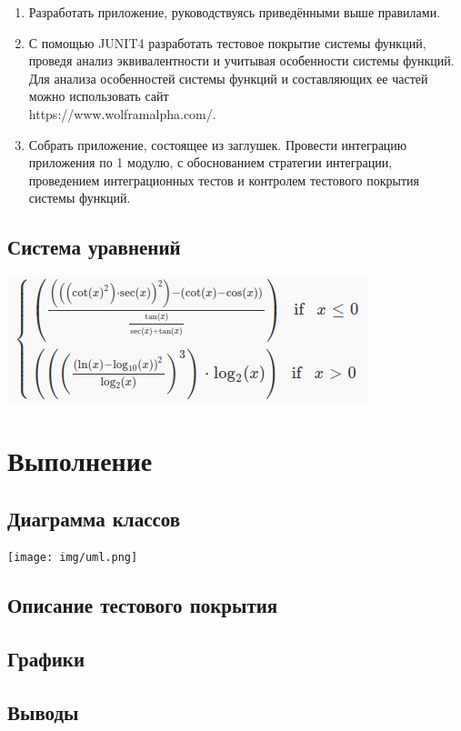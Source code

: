 \begin{enumerate}
\item Разработать приложение, руководствуясь приведёнными выше правилами.
\item С помощью JUNIT4 разработать тестовое покрытие системы функций,
проведя анализ эквивалентности и учитывая особенности системы функций.
Для анализа особенностей системы функций и составляющих ее частей можно
использовать сайт \\ https://www.wolframalpha.com/.
\item Собрать приложение, состоящее из заглушек.  Провести интеграцию приложения
по 1 модулю, с обоснованием стратегии интеграции, проведением интеграционных
тестов и контролем тестового покрытия системы функций.
\end{enumerate}
\subsection{Система уравнений}
\includegraphics[width=300bp]{img/system.png}
\section{Выполнение}
\subsection{Диаграмма классов}
\texttt{[image: img/uml.png]}
\subsection{Описание тестового покрытия}
\subsection{Графики}
\subsection{Выводы}


